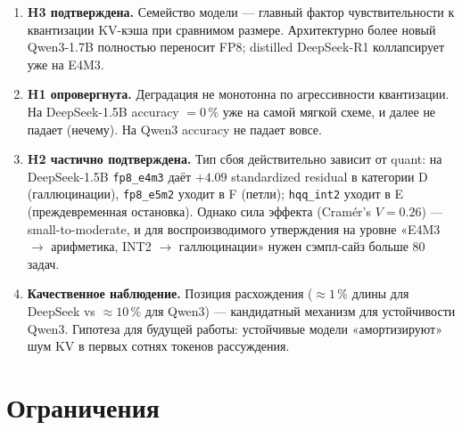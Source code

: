 \documentclass[11pt, a4paper]{article}
\newcommand{\code}[1]{\texttt{#1}}
\begin{document}
\begin{enumerate}[leftmargin=*]
\item \textbf{H3 подтверждена.} Семейство модели — главный фактор
чувствительности к квантизации KV-кэша при сравнимом размере.
Архитектурно более новый Qwen3-1.7B полностью переносит FP8;
distilled DeepSeek-R1 коллапсирует уже на E4M3.

\item \textbf{H1 опровергнута.} Деградация не монотонна по
агрессивности квантизации. На DeepSeek-1.5B accuracy $= 0\,\%$ уже на
самой мягкой схеме, и далее не падает (нечему). На Qwen3 accuracy
не падает вовсе.

\item \textbf{H2 частично подтверждена.} Тип сбоя действительно
зависит от quant: на DeepSeek-1.5B \code{fp8\_e4m3} даёт $+4.09$
standardized residual в категории D (галлюцинации), \code{fp8\_e5m2}
уходит в F (петли); \code{hqq\_int2} уходит в E (преждевременная
остановка). Однако сила эффекта (Cramér's $V = 0.26$) —
small-to-moderate, и для воспроизводимого утверждения на уровне
«E4M3 $\to$ арифметика, INT2 $\to$ галлюцинации» нужен сэмпл-сайз
больше $80$ задач.

\item \textbf{Качественное наблюдение.} Позиция расхождения
($\approx 1\,\%$ длины для DeepSeek vs $\approx 10\,\%$ для Qwen3)
— кандидатный механизм для устойчивости Qwen3. Гипотеза для будущей
работы: устойчивые модели «амортизируют» шум KV в первых сотнях
токенов рассуждения.
\end{enumerate}

\section{Ограничения}
\label{sec:limitations}
\end{document}
